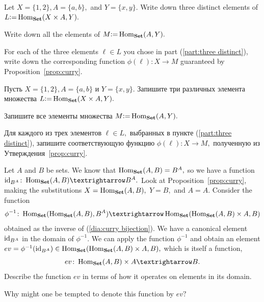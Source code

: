 \documentclass[../main/CT4S-EN-RU]{subfiles}
\begin{document}
\begin{exerciseENG}
Let $X=\{1,2\}, A=\{a,b\},$ and $Y=\{x,y\}.$ 
\sexc\label{part:three distinct} Write down three distinct elements of $L{\mathrel{\mathop:}=}\operatorname{Hom}_{\mathbf{Set}}(X\times A,Y).$ 
\item Write down all the elements of $M{\mathrel{\mathop:}=}\operatorname{Hom}_{\mathbf{Set}}(A,Y).$ 
\item For each of the three elements $\ell\in L$ you chose in part (\ref{part:three distinct}), write down the corresponding function $\phi(\ell)\colon X{→} M$ guaranteed by Proposition~\ref{prop:curry}.
\endsexc
\end{exerciseENG}

\begin{exerciseRUS}
Пусть $X=\{1,2\}, A=\{a,b\}$ и $Y=\{x,y\}.$ 
\sexc\label{part:three distinct} Запишите три различных элемента множества $L{\mathrel{\mathop:}=}\operatorname{Hom}_{\mathbf{Set}}(X\times A,Y).$ 
\item Запишите все элементы множества $M{\mathrel{\mathop:}=}\operatorname{Hom}_{\mathbf{Set}}(A,Y).$ 
\item Для каждого из трех элементов $\ell\in L,$ выбранных в пункте (\ref{part:three distinct}), запишите соответствующую функцию $\phi(\ell)\colon X{→} M,$ полученную из Утверждения~\ref{prop:curry}.
\endsexc
\end{exerciseRUS}

\begin{exerciseENG}\label{exc:evaluation}
Let $A$ and $B$ be sets. We know that $\operatorname{Hom}_{\mathbf{Set}}(A,B)=B^A,$ so we have a function $\id_{B^A}\colon\Hom_\Set(A,B){→} B^A.$ Look at Proposition~\ref{prop:curry}, making the substitutions $X=\operatorname{Hom}_{\mathbf{Set}}(A,B),$ $Y=B,$ and  $A=A.$ Consider the function $$\phi^{-1}\colon\Hom_\Set(\Hom_\Set(A,B),B^A){→}\Hom_\Set(\Hom_\Set(A,B)\times A,B)$$ obtained as the inverse of (\ref{dia:curry bijection}). We have a canonical element $\operatorname{id}_{B^A}$ in the domain of $\phi^{-1}.$ We can apply the function $\phi^{-1}$ and obtain an element $ev=\phi^{-1}(\operatorname{id}_{B^A})\in\operatorname{Hom}_{\mathbf{Set}}(\operatorname{Hom}_{\mathbf{Set}}(A,B)\times A,B),$ which is itself a function, $$ev\colon\Hom_\Set(A,B)\times A{→} B.$$ 
\sexc Describe the function $ev$ in terms of how it operates on elements in its domain. 
\item Why might one be tempted to denote this function by $ev?$
\endsexc
\end{exerciseENG}
\end{document}
